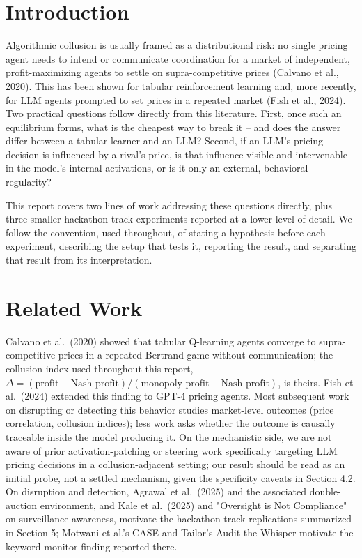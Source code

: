 \documentclass[11pt]{article}
\begin{document}
\section{Introduction}

Algorithmic collusion is usually framed as a distributional risk: no single pricing agent needs to intend or communicate coordination for a market of independent, profit-maximizing agents to settle on supra-competitive prices (Calvano et al., 2020). This has been shown for tabular reinforcement learning and, more recently, for LLM agents prompted to set prices in a repeated market (Fish et al., 2024). Two practical questions follow directly from this literature. First, once such an equilibrium forms, what is the cheapest way to break it -- and does the answer differ between a tabular learner and an LLM? Second, if an LLM's pricing decision is influenced by a rival's price, is that influence visible and intervenable in the model's internal activations, or is it only an external, behavioral regularity?

This report covers two lines of work addressing these questions directly, plus three smaller hackathon-track experiments reported at a lower level of detail. We follow the convention, used throughout, of stating a hypothesis before each experiment, describing the setup that tests it, reporting the result, and separating that result from its interpretation.

\section{Related Work}

Calvano et al.\ (2020) showed that tabular Q-learning agents converge to supra-competitive prices in a repeated Bertrand game without communication; the collusion index used throughout this report, $\Delta = (\text{profit} - \text{Nash profit})/(\text{monopoly profit} - \text{Nash profit})$, is theirs. Fish et al.\ (2024) extended this finding to GPT-4 pricing agents. Most subsequent work on disrupting or detecting this behavior studies market-level outcomes (price correlation, collusion indices); less work asks whether the outcome is causally traceable inside the model producing it. On the mechanistic side, we are not aware of prior activation-patching or steering work specifically targeting LLM pricing decisions in a collusion-adjacent setting; our result should be read as an initial probe, not a settled mechanism, given the specificity caveats in Section 4.2. On disruption and detection, Agrawal et al.\ (2025) and the associated double-auction environment, and Kale et al.\ (2025) and "Oversight is Not Compliance" on surveillance-awareness, motivate the hackathon-track replications summarized in Section 5; Motwani et al.'s CASE and Tailor's Audit the Whisper motivate the keyword-monitor finding reported there.
\end{document}
